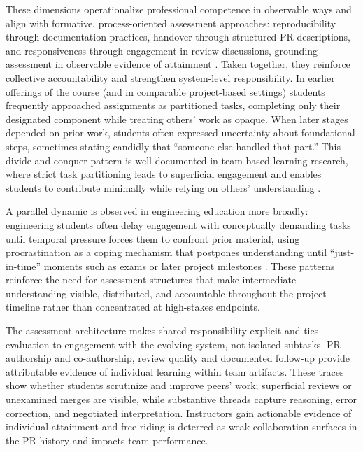 These dimensions operationalize professional competence in observable ways and align with formative, process-oriented assessment approaches: reproducibility through documentation practices, handover through structured PR descriptions, and responsiveness through engagement in review discussions, grounding assessment in observable evidence of attainment \parencite{biggs_constructive}. 
Taken together, they reinforce collective accountability and strengthen system-level responsibility. In earlier offerings of the course (and in comparable project-based settings) students frequently approached assignments as partitioned tasks, completing only their designated component while treating others' work as opaque. When later stages depended on prior work, students often expressed uncertainty about foundational steps, sometimes stating candidly that ``someone else handled that part.'' This divide-and-conquer pattern is well-documented in team-based learning research, where strict task partitioning leads to superficial engagement and enables students to contribute minimally while relying on others' understanding \parencite{borjesson_freeriding_2006}.

A parallel dynamic is observed in engineering education more broadly: engineering students often delay engagement with conceptually demanding tasks until temporal pressure forces them to confront prior material, using procrastination as a coping mechanism that postpones understanding until ``just-in-time'' moments such as exams or later project milestones \parencite{wilhelm_procrastination_2023,kim_nembhard_2019}. These patterns reinforce the need for assessment structures that make intermediate understanding visible, distributed, and accountable throughout the project timeline rather than concentrated at high-stakes endpoints.

The assessment architecture makes shared responsibility explicit and ties evaluation to engagement with the evolving system, not isolated subtasks. PR authorship and co-authorship, review quality and documented follow-up provide attributable evidence of individual learning within team artifacts. These traces show whether students scrutinize and improve peers' work; superficial reviews or unexamined merges are visible, while substantive threads capture reasoning, error correction, and negotiated interpretation. Instructors gain actionable evidence of individual attainment and free-riding is deterred as weak collaboration surfaces in the PR history and impacts team performance.

